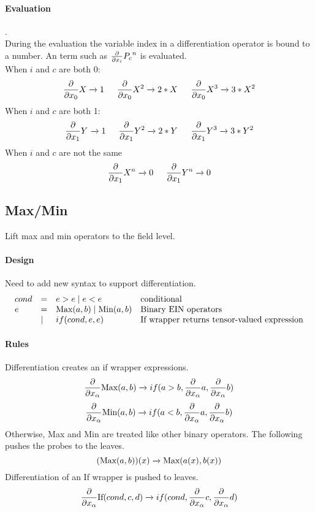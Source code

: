 \documentclass{article}
\begin{document}
\paragraph{Evaluation}.\\
During the evaluation the variable index in a differentiation operator is bound to a number.
An \name{} term such as $\expPolyTermD{P_c}{n}{i}$ is evaluated.\\
When $i$ and $c$ are both 0:\\ 
$$\frac{\partial}{\partial x_0} X \rewriteEINEXP  1 
 \indent  \frac{\partial}{\partial x_0} X^2 \rewriteEINEXP  2*\expPolyTerm{X}{}  
  \indent \frac{\partial}{\partial x_0} X^3  \rewriteEINEXP  3*X^{2} $$ 
When $i$ and $c$ are both 1:\\ 
$$
\expPolyTermD{Y}{}{1} \rewriteEINEXP  1 
 \indent  \expPolyTermD{Y}{2}{1} \rewriteEINEXP  2*\expPolyTerm{Y}{}  
  \indent  \expPolyTermD{Y}{3}{1} \rewriteEINEXP  3*\expPolyTerm{Y}{2}  
   $$  
When $i$ and $c$ are not the same\\ 
$$ \expPolyTermD{X}{n}{1} \rewriteEINEXP  0 
\indent \expPolyTermD{Y}{n}{1} \rewriteEINEXP  0  $$ 


\subsection{Max/Min}

Lift max and min operators to the field level.
\paragraph{Design}
Need to add new syntax to support differentiation.
$$\begin{array}{llll}
cond &=& e>e \mid e<e & \text{conditional }\\
e&=&  \text{Max}(a,b)  \mid \text{Min}(a,b) & \text{Binary \name{} operators}\\
&\mid & if(cond, e, e)  &\text{If wrapper returns tensor-valued expression}
\end{array}$$

 \paragraph{Rules}
Differentiation creates an if wrapper expressions.
 $$\frac{\partial}{\partial x_\alpha} \text{Max}(a,b) \rewriteEINEXP if(a>b, \frac{\partial}{\partial x_\alpha}a, \frac{\partial}{\partial x_\alpha}b)  $$
 $$\frac{\partial}{\partial x_\alpha}\text{Min}(a,b) \rewriteEINEXP if(a<b, \frac{\partial}{\partial x_\alpha}  a, \frac{\partial}{\partial x_\alpha} b)  $$
Otherwise, Max and Min are treated like  other binary operators. The following pushes the probes to the leaves.
  $$ (\text{Max}(a,b))(x) \rewriteEINEXP \text{Max}(a(x),  b(x)) $$
 Differentiation of an If wrapper is pushed to leaves.
   $$\frac{\partial}{\partial x_\alpha} \text{If}(cond, c,d) \rewriteEINEXP if(cond, \frac{\partial}{\partial x_\alpha}c, \frac{\partial}{\partial x_\alpha}d)  $$
   
\end{document}
